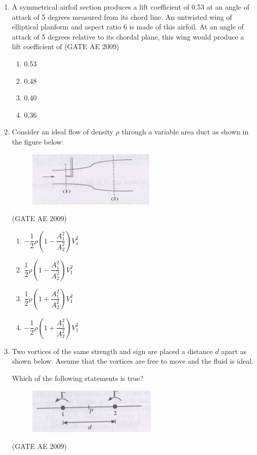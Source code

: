 \documentclass[journal,12pt,onecolumn]{IEEEtran}
\theoremstyle{remark}
\begin{document}
\begin{flushleft}
\begin{enumerate}
\item 
A symmetrical airfoil section produces a lift coefficient of 0.53 at an angle of attack of 5 degrees measured from its chord line. An untwisted wing of elliptical planform and aspect ratio 6 is made of this airfoil. At an angle of attack of 5 degrees relative to its chordal plane, this wing would produce a lift coefficient of  
\hfill(GATE AE 2009)
\begin{enumerate}
\item 0.53
\item 0.48
\item 0.40
\item 0.36
\end{enumerate}

\item Consider an ideal flow of density $\rho$ through a variable area duct as shown in the figure below:
\begin{figure}[H]
    \centering
    \includegraphics[width=0.5\columnwidth]{figs/36.png}
    \caption{}
    \label{fig:placeholder}
\end{figure}
\hfill(GATE AE 2009)

\begin{multicols}{2}
\begin{enumerate}
\item $-\dfrac{1}{2} \rho \left( 1 - \dfrac{A_1^2}{A_2^2} \right) V_1^2$
\item $\dfrac{1}{2} \rho \left( 1 - \dfrac{A_1^2}{A_2^2} \right) V_1^2$
\item $\dfrac{1}{2} \rho \left( 1 + \dfrac{A_1^2}{A_2^2} \right) V_1^2$
\item $-\dfrac{1}{2} \rho \left( 1 + \dfrac{A_1^2}{A_2^2} \right) V_1^2$
\end{enumerate}
\end{multicols}


\item Two vortices of the same strength and sign are placed a distance $d$ apart as shown below. Assume that the vortices are free to move and the fluid is ideal.

Which of the following statements is true?
\begin{figure}[H]
    \centering
    \includegraphics[width=0.5\columnwidth]{figs/37.png}
    \caption{}
    \label{fig:placeholder}
\end{figure}
\hfill(GATE AE 2009)


\end{enumerate}
\end{flushleft}
\end{document}
